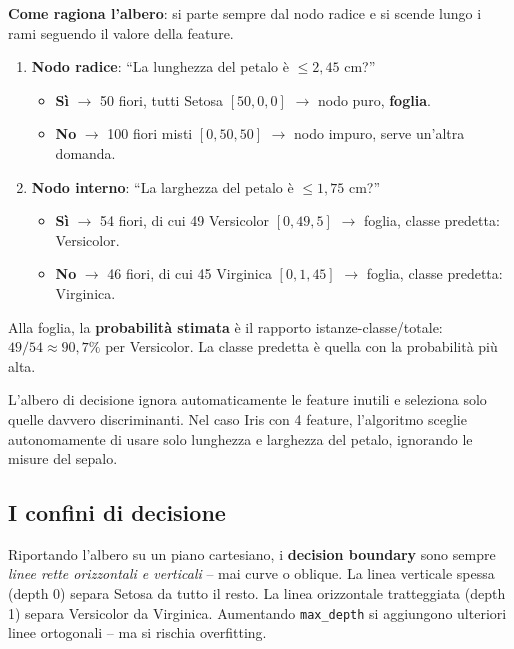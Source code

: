 \textbf{Come ragiona l'albero}: si parte sempre dal nodo radice e si scende lungo i rami seguendo il valore della feature.

\begin{enumerate}
    \item \textbf{Nodo radice}: ``La lunghezza del petalo è $\leq 2{,}45$ cm?''
    \begin{itemize}
        \item \textbf{Sì} $\to$ 50 fiori, tutti Setosa $[50,0,0]$ $\to$ nodo puro, \textbf{foglia}.
        \item \textbf{No} $\to$ 100 fiori misti $[0,50,50]$ $\to$ nodo impuro, serve un'altra domanda.
    \end{itemize}
    \item \textbf{Nodo interno}: ``La larghezza del petalo è $\leq 1{,}75$ cm?''
    \begin{itemize}
        \item \textbf{Sì} $\to$ 54 fiori, di cui 49 Versicolor $[0,49,5]$ $\to$ foglia, classe predetta: Versicolor.
        \item \textbf{No} $\to$ 46 fiori, di cui 45 Virginica $[0,1,45]$ $\to$ foglia, classe predetta: Virginica.
    \end{itemize}
\end{enumerate}

Alla foglia, la \textbf{probabilità stimata} è il rapporto istanze-classe/totale: $49/54 \approx 90{,}7\%$ per Versicolor. La classe predetta è quella con la probabilità più alta.

\begin{notebox}
L'albero di decisione ignora automaticamente le feature inutili e seleziona solo quelle davvero discriminanti. Nel caso Iris con 4 feature, l'algoritmo sceglie autonomamente di usare solo lunghezza e larghezza del petalo, ignorando le misure del sepalo.
\end{notebox}

\subsection{I confini di decisione}

Riportando l'albero su un piano cartesiano, i \textbf{decision boundary} sono sempre \emph{linee rette orizzontali e verticali} -- mai curve o oblique. La linea verticale spessa (depth 0) separa Setosa da tutto il resto. La linea orizzontale tratteggiata (depth 1) separa Versicolor da Virginica. Aumentando \texttt{max\_depth} si aggiungono ulteriori linee ortogonali -- ma si rischia overfitting.


